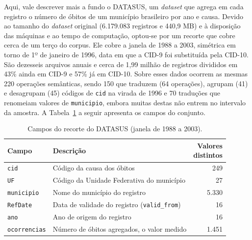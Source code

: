 Aqui, vale descrever mais a fundo o DATASUS, um \textit{dataset} que agrega em cada registro o número de óbitos de um município brasileiro por ano e causa. Devido ao tamanho do \textit{dataset} original (6.179.083 registros e 440,9 MB) e à disposição das máquinas e ao tempo de computação, optou-se por um recorte que cobre cerca de um terço do corpus. Ele cobre a janela de 1988 a 2003, simétrica em torno de 1º de janeiro de 1996, data em que a CID-9 foi substituída pela CID-10. São dezesseis arquivos anuais e cerca de 1,99 milhão de registros divididos em 43\% ainda em CID-9 e 57\% já em CID-10. Sobre esses dados ocorrem as mesmas 220 operações semânticas, sendo 150 que traduzem (64 operações), agrupam (41) e desagrupam (45) códigos de \texttt{cid} na virada de 1996 e 70 traduções que renomeiam valores de \texttt{municipio}, embora muitas destas não entrem no intervalo da amostra. A Tabela~\ref{tab:datasus-campos} a seguir apresenta os campos do conjunto.

\begin{table}[htb]
  \centering
  \caption{Campos do recorte do DATASUS (janela de 1988 a 2003).}
  \label{tab:datasus-campos}
  \begin{tabular}{@{}l >{\raggedright\arraybackslash}p{7.8cm} r@{}}
    \toprule
    Campo & Descrição & \makecell[r]{Valores\\distintos} \\
    \midrule
    \texttt{cid}         & Código da causa dos óbitos & 249 \\
    \texttt{UF}          & Código da Unidade Federativa do município & 27 \\
    \texttt{municipio}   & Nome do município do registro & 5.330 \\
    \texttt{RefDate}     & Data de validade do registro (\texttt{valid\_from}) & 16 \\
    \texttt{ano}         & Ano de origem do registro & 16 \\
    \texttt{ocorrencias} & Número de óbitos agregados, o valor medido & 1.451 \\
    \bottomrule
  \end{tabular}
\end{table}


